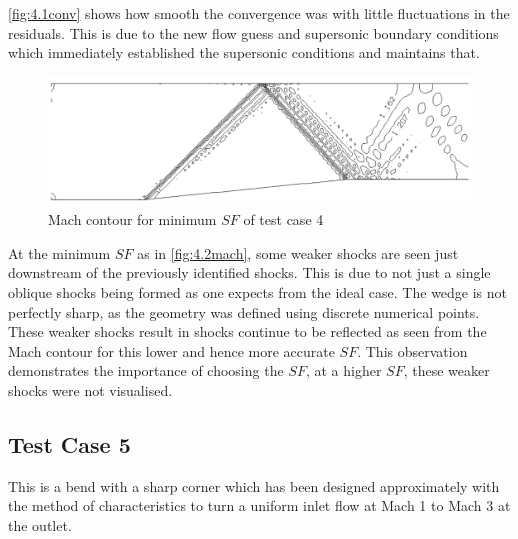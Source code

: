 \documentclass[12pt, a4paper]{article}
\begin{document}
\autoref{fig:4.1conv} shows how smooth the convergence was with little fluctuations in the residuals. This is due to the new flow guess and supersonic boundary conditions which immediately established the supersonic conditions and maintains that.
\begin{figure}[H]
	\centering
	\includegraphics[width=\textwidth]{plots/4.2 mach}
	\caption{Mach contour for minimum $SF$ of test case 4}
	\label{fig:4.2mach}
\end{figure}
At the minimum $SF$ as in \autoref{fig:4.2mach}, some weaker shocks are seen just downstream of the previously identified shocks. This is due to not just a single oblique shocks being formed as one expects from the ideal case. The wedge is not perfectly sharp, as the geometry was defined using discrete numerical points. These weaker shocks result in shocks continue to be reflected as seen from the Mach contour for this lower and hence more accurate $SF$. This observation demonstrates the importance of choosing the $SF$, at a higher $SF$, these weaker shocks were not visualised.
\subsection{Test Case 5}
This is a bend with a sharp corner which has been designed approximately with the method of characteristics to turn a uniform inlet flow at Mach 1 to Mach 3 at the outlet.
\end{document}
